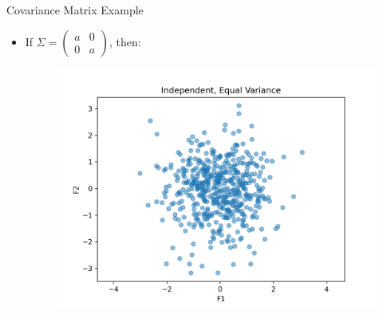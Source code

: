 \documentclass[serif, aspectratio=169]{beamer}
\begin{document}
\begin{frame}{Covariance Matrix Example}
    \begin{itemize}         
        \item If $\Sigma = 
\begin{pmatrix}
a & 0  \\
0 & a 
\end{pmatrix}$, then:
        \begin{figure}[htpb]
            \begin{center}
         \includegraphics[keepaspectratio, scale=0.5]{pic/independent_equal_variance.png}
            \end{center}
        \end{figure}
    \end{itemize}
\end{frame}
\end{document}
